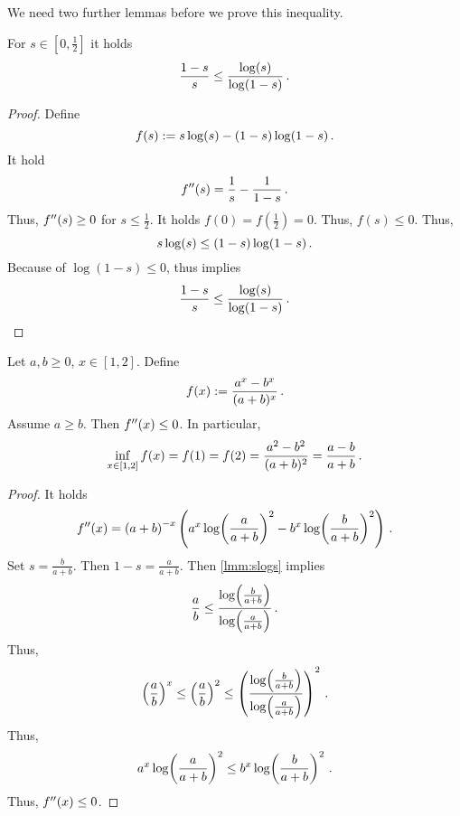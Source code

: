 %
We need two further lemmas before we prove this inequality.
%
\begin{lemma}\label{lmm:slogs}
	For $s\in[0,\frac12]$ it holds
	\begin{equation*}
		\frac{1-s}{s} \leq \frac{\log(s)}{\log(1-s)}
		\, .
	\end{equation*}
\end{lemma}
%
\begin{proof}
	Define
	\begin{equation*}
		f(s) := s\log(s) - (1-s)\log(1-s)
		\, .
	\end{equation*}
	It hold
	\begin{equation*}
		f^{\prime\prime}(s) = \frac1s-\frac1{1-s} 
		\, .
	\end{equation*}
	Thus, $f^{\prime\prime}(s) \geq 0$ for $s\leq\frac12$.
	It holds $f(0)=f(\frac12)=0$.
	Thus, $f(s) \leq 0$. Thus,
	\begin{equation*}
		s\log(s) \leq (1-s)\log(1-s)
		\, .
	\end{equation*}
	Because of $\log(1-s) \leq 0$, thus implies 
	\begin{equation*}
		\frac{1-s}{s} \leq \frac{\log(s)}{\log(1-s)}
		\, .
	\end{equation*}
\end{proof}
%
\begin{lemma}\label{lmm:abxfrac}
	Let $a,b\geq0$, $x\in[1,2]$.
	Define
	\begin{equation*}
		f(x) := \frac{a^{x}-b^{x}}{(a+b)^{x}}
		\, .
	\end{equation*}
	Assume $a\geq b$.
	Then $f^{\prime\prime}(x) \leq 0$.
	In particular,
	\begin{equation*}
		\inf_{x\in[1,2]} f(x) = f(1) = f(2) = \frac{a^2-b^2}{(a+b)^2} = \frac{a-b}{a+b}
		\, .
	\end{equation*}
\end{lemma}
%
\begin{proof}
	It holds
	\begin{equation*}
		f^{\prime\prime}(x) = \left( a+b \right)^{-x} \left( a^x \log\!\left( \frac{a}{a+b} \right)^2 - b^x \log\!\left( \frac{b}{a+b} \right)^2 \right)
		\, .
	\end{equation*}
	Set $s = \frac{b}{a+b}$. Then $1-s = \frac{a}{a+b}$. Then \autoref{lmm:slogs} implies
	\begin{equation*}
		\frac{a}{b} \leq \frac{\log\!\left( \frac{b}{a+b} \right)}{\log\!\left( \frac{a}{a+b} \right)}
		\, .
	\end{equation*}
	Thus,
	\begin{align*}
		\left( \frac{a}{b} \right)^x \leq \left( \frac{a}{b} \right)^2 \leq \left( \frac{\log\!\left( \frac{b}{a+b} \right)}{\log\!\left( \frac{a}{a+b} \right)} \right)^2
		\, .
	\end{align*}
	Thus,
	\begin{equation*}
		a^x \log\!\left( \frac{a}{a+b} \right)^2 \leq b^x \log\!\left( \frac{b}{a+b} \right)^2
		\, .
	\end{equation*}
	Thus, $f^{\prime\prime}(x) \leq 0$.
\end{proof}
